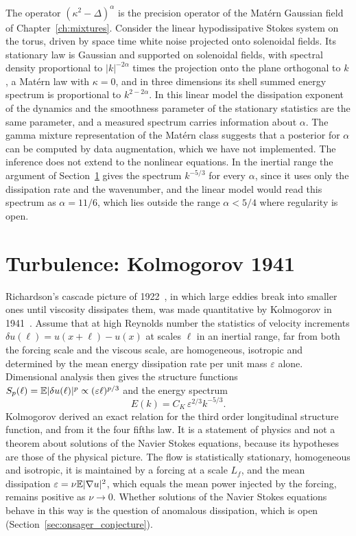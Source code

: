 The operator $(\kappa^2-\Delta)^\alpha$ is the precision operator of the Mat\'ern Gaussian field of Chapter~\ref{ch:mixtures}. Consider the linear hypodissipative Stokes system on the torus, driven by space time white noise projected onto solenoidal fields. Its stationary law is Gaussian and supported on solenoidal fields, with spectral density proportional to $|k|^{-2\alpha}$ times the projection onto the plane orthogonal to $k$, a Mat\'ern law with $\kappa = 0$, and in three dimensions its shell summed energy spectrum is proportional to $k^{2-2\alpha}$. In this linear model the dissipation exponent of the dynamics and the smoothness parameter of the stationary statistics are the same parameter, and a measured spectrum carries information about $\alpha$. The gamma mixture representation of the Mat\'ern class suggests that a posterior for $\alpha$ can be computed by data augmentation, which we have not implemented. The inference does not extend to the nonlinear equations. In the inertial range the argument of Section~\ref{sec:k41} gives the spectrum $k^{-5/3}$ for every $\alpha$, since it uses only the dissipation rate and the wavenumber, and the linear model would read this spectrum as $\alpha = 11/6$, which lies outside the range $\alpha<5/4$ where regularity is open.

\section{Turbulence: Kolmogorov 1941}\label{sec:k41}

Richardson's cascade picture of 1922~\cite{richardson1922}, in which large eddies break into smaller ones until viscosity dissipates them, was made quantitative by Kolmogorov in 1941~\cite{kolmogorov1941a,kolmogorov1941b}. Assume that at high Reynolds number the statistics of velocity increments $\delta u(\ell) = u(x+\ell)-u(x)$ at scales $\ell$ in an inertial range, far from both the forcing scale and the viscous scale, are homogeneous, isotropic and determined by the mean energy dissipation rate per unit mass $\varepsilon$ alone. Dimensional analysis then gives the structure functions $S_p(\ell) = \mathbb{E}|\delta u(\ell)|^p\propto(\varepsilon\ell)^{p/3}$ and the energy spectrum
\[
E(k) = C_K\,\varepsilon^{2/3}k^{-5/3}.
\]
Kolmogorov derived an exact relation for the third order longitudinal structure function, and from it the four fifths law. It is a statement of physics and not a theorem about solutions of the Navier Stokes equations, because its hypotheses are those of the physical picture. The flow is statistically stationary, homogeneous and isotropic, it is maintained by a forcing at a scale $L_f$, and the mean dissipation $\varepsilon = \nu\mathbb{E}|\nabla u|^2$, which equals the mean power injected by the forcing, remains positive as $\nu\to0$. Whether solutions of the Navier Stokes equations behave in this way is the question of anomalous dissipation, which is open (Section~\ref{sec:onsager_conjecture}).


